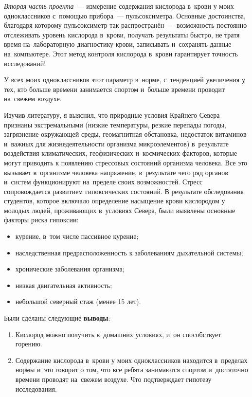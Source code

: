 \textit{Вторая часть проекта}~--- измерение содержания кислорода в~крови у моих одноклассников с~помощью прибора~--- пульсоксиметра. Основные достоинства, благодаря которому пульсоксиметр так распространён~--- возможность постоянно отслеживать уровень кислорода в~крови, получать результаты быстро, не тратя время на~лабораторную диагностику крови, записывать и~сохранять данные на~компьютере. Этот метод контроля кислорода в~крови гарантирует точность исследований!

У всех моих одноклассников этот параметр в~норме, с~тенденцией увеличения у тех, кто больше времени занимается спортом и~больше времени проводит на~свежем воздухе.

Изучив литературу, я выяснил, что природные условия Крайнего Севера признаны экстремальными (низкие температуры, резкие перепады погоды, загрязнение окружающей среды, геомагнитная обстановка, недостаток витаминов и~важных для жизнедеятельности организма микроэлементов) в~результате воздействия климатических, геофизических и~космических факторов, которые могут приводить к появлению стрессовых состояний организма человека. Все это вызывает в~организме человека напряжение, в~результате чего ряд органов и~систем функционируют на~пределе своих возможностей. Стресс сопровождается развитием гипоксических состояний. В результате обследования студентов, которое включало определение насыщение крови кислородом у молодых людей, проживающих в~условиях Севера, были выявлены основные факторы риска гипоксии:
\begin{itemize}[noitemsep]\vspace{-8pt}
  \item курение, в~том числе пассивное курение;
  \item наследственная предрасположенность к заболеваниям дыхательной системы;
  \item хронические заболевания организма;
  \item низкая двигательная активность;
  \item небольшой северный стаж (менее 15 лет).
\end{itemize}\vspace{-8pt}

Были сделаны следующие \textbf{выводы}:
\begin{enumerate}[noitemsep]\vspace{-8pt}
\item Кислород можно получить в~домашних условиях, и~он способствует горению.
\item Содержание кислорода в~крови у моих одноклассников находится в~пределах нормы и~это говорит о том, что все ребята занимаются спортом и~достаточно времени проводят на~свежем воздухе. Что подтверждает гипотезу исследования.
\end{enumerate}\vspace{-8pt}

